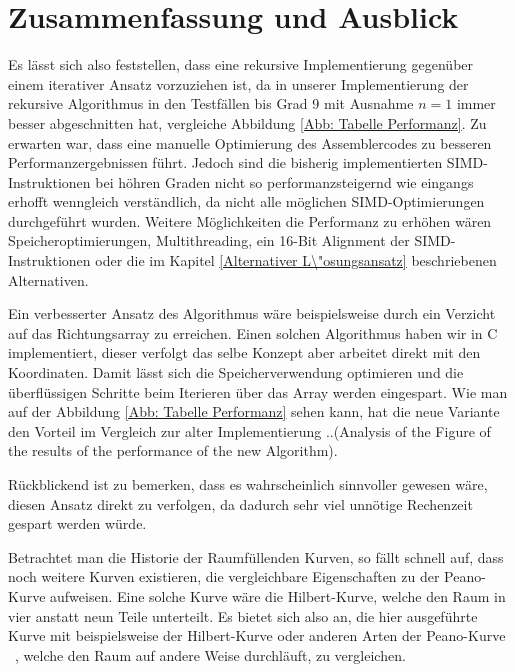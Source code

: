 \documentclass[course=asp]{aspdoc}
\begin{document}
\section{Zusammenfassung und Ausblick} \label{Zusammenfassung und Ausblick}
Es l\"asst sich also feststellen, dass eine rekursive Implementierung gegen\"uber einem iterativer Ansatz vorzuziehen ist, da in unserer Implementierung der rekursive Algorithmus in den Testf\"allen bis Grad 9 mit Ausnahme $n = 1$ immer besser abgeschnitten hat, vergleiche Abbildung \ref{Abb: Tabelle Performanz}. Zu erwarten war, dass eine manuelle Optimierung des Assemblercodes zu besseren Performanzergebnissen f\"uhrt. Jedoch sind die bisherig implementierten SIMD-Instruktionen bei h\"ohren Graden nicht so performanzsteigernd wie eingangs erhofft wenngleich verst\"andlich, da nicht alle m\"oglichen SIMD-Optimierungen durchgef\"uhrt wurden. Weitere M\"oglichkeiten die Performanz zu erh\"ohen w\"aren Speicheroptimierungen, Multithreading, ein 16-Bit Alignment der SIMD-Instruktionen oder die im Kapitel \ref{Alternativer L\"osungsansatz} beschriebenen Alternativen.

Ein verbesserter Ansatz des Algorithmus w\"are beispielsweise durch ein Verzicht auf das Richtungsarray zu erreichen. Einen solchen Algorithmus haben wir in C implementiert, dieser verfolgt das selbe Konzept aber arbeitet direkt mit den Koordinaten. Damit l\"asst sich die Speicherverwendung optimieren und die \"uberfl\"ussigen Schritte beim Iterieren \"uber das Array werden eingespart. Wie man auf der Abbildung \ref{Abb: Tabelle Performanz} sehen kann, hat die neue Variante den Vorteil im Vergleich zur alter Implementierung ..(Analysis of the Figure of the results of the performance of the new Algorithm).

R\"uckblickend ist zu bemerken, dass es wahrscheinlich sinnvoller gewesen w\"are, diesen Ansatz direkt zu verfolgen, da dadurch sehr viel unn\"otige Rechenzeit gespart werden w\"urde.

Betrachtet man die Historie der Raumf\"ullenden Kurven, so f\"allt schnell auf, dass noch weitere Kurven existieren, die vergleichbare Eigenschaften zu der Peano-Kurve aufweisen. Eine solche Kurve w\"are die Hilbert-Kurve, welche den Raum in vier anstatt neun Teile unterteilt. Es bietet sich also an, die hier ausgef\"uhrte Kurve mit beispielsweise der Hilbert-Kurve oder anderen Arten der Peano-Kurve ~\cite{raumKurven}, welche den Raum auf andere Weise durchl\"auft, zu vergleichen.


\newpage

{}
\end{document}

